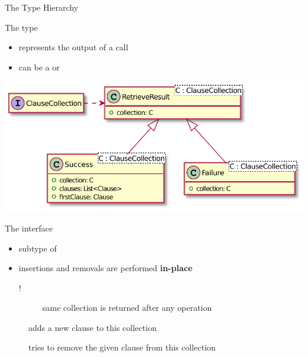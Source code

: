 \documentclass[handout]{beamer}
\begin{document}
\begin{frame}[allowframebreaks]{The  Type Hierarchy}
    \framebreak

    \begin{block}{The  type}
        \begin{itemize}
            \item represents the output of a  call
            \item can be a  or 
        \end{itemize}
    \end{block}
    \begin{center}
        \includegraphics[width=0.8\linewidth]{img/retrieve-result.pdf}
    \end{center}

    \framebreak

    \begin{block}{The  interface}
        \begin{itemize}
            \item subtype of 
            \item insertions and removals are performed \textbf{in-place}
            \begin{description}
                \item [!] same collection is returned after any operation
            \end{description}
        \end{itemize}
    \end{block}
    \begin{description}
        \item [] adds a new clause to this collection
        \item [] tries to remove the given clause from this collection
    \end{description}

    \framebreak


\end{frame}
\end{document}
